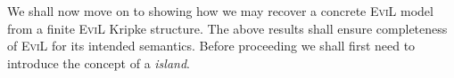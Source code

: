 We shall now move on to showing how we may
recover a concrete \textsc{EviL} model from a finite \textsc{EviL}
Kripke structure.  The above results shall ensure completeness of
\textsc{EviL} for its intended semantics.  Before proceeding 
we shall first need to introduce the concept of a \emph{island}.

